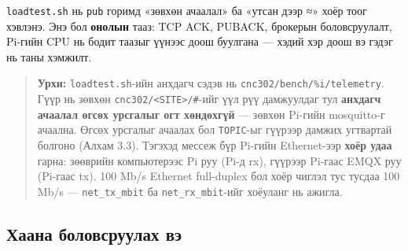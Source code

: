 \texttt{loadtest.sh} нь \texttt{pub} горимд «зөвхөн ачаалал» ба «утсан дээр ≈» хоёр тоог хэвлэнэ. Энэ бол \textbf{онолын} тааз: TCP ACK, PUBACK, брокерын боловсруулалт, Pi-гийн CPU нь бодит таазыг үүнээс доош буулгана --- хэдий хэр доош вэ гэдэг нь таны хэмжилт.

\begin{quote}
\textbf{Урхи:} \texttt{loadtest.sh}-ийн анхдагч сэдэв нь \texttt{cnc302/\allowbreak{}bench/\allowbreak{}\%i/\allowbreak{}telemetry}. Гүүр нь зөвхөн \texttt{cnc302/\allowbreak{}\textless{}SITE\textgreater{}/\allowbreak{}\#}-ийг үүл рүү дамжуулдаг тул \textbf{анхдагч ачаалал өгсөх урсгалыг огт хөндөхгүй} --- зөвхөн Pi-гийн mosquitto-г ачаална. Өгсөх урсгалыг ачаалах бол \texttt{TOPIC}-ыг гүүрээр дамжих угтвартай болгоно (Алхам 3.3). Тэгэхэд мессеж бүр Pi-гийн Ethernet-ээр \textbf{хоёр удаа} гарна: зөөврийн компьютерээс Pi руу (Pi-д rx), гүүрээр Pi-гаас EMQX руу (Pi-гаас tx). 100 Mb/s Ethernet full-duplex бол хоёр чиглэл тус тусдаа 100 Mb/s --- \texttt{net\_\allowbreak{}tx\_\allowbreak{}mbit} ба \texttt{net\_\allowbreak{}rx\_\allowbreak{}mbit}-ийг хоёуланг нь ажигла.
\end{quote}

\hypertarget{ux445ux430ux430ux43dux430-ux431ux43eux43bux43eux432ux441ux440ux443ux443ux43bux430ux445-ux432ux44d}{%
\subsection{Хаана боловсруулах вэ}\label{ux445ux430ux430ux43dux430-ux431ux43eux43bux43eux432ux441ux440ux443ux443ux43bux430ux445-ux432ux44d}}

